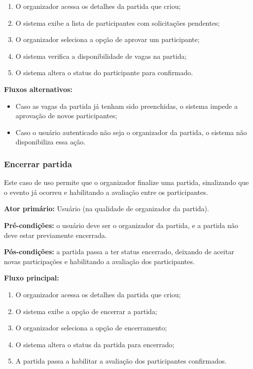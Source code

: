 \documentclass[a4paper, 12pt]{article}
\begin{document}
\begin{justify}
\begin{enumerate}
    \item O organizador acessa os detalhes da partida que criou;
    \item O sistema exibe a lista de participantes com solicitações pendentes;
    \item O organizador seleciona a opção de aprovar um participante;
    \item O sistema verifica a disponibilidade de vagas na partida;
    \item O sistema altera o status do participante para confirmado.
\end{enumerate}

\textbf{Fluxos alternativos:}

\begin{itemize}
    \item Caso as vagas da partida já tenham sido preenchidas, o sistema impede a aprovação de novos participantes;
    \item Caso o usuário autenticado não seja o organizador da partida, o sistema não disponibiliza essa ação.
\end{itemize}

\subsubsection{Encerrar partida}

Este caso de uso permite que o organizador finalize uma partida, sinalizando que o evento já ocorreu e habilitando a avaliação entre os participantes.

\textbf{Ator primário:} Usuário (na qualidade de organizador da partida).

\textbf{Pré-condições:} o usuário deve ser o organizador da partida, e a partida não deve estar previamente encerrada.

\textbf{Pós-condições:} a partida passa a ter status encerrado, deixando de aceitar novas participações e habilitando a avaliação dos participantes.

\textbf{Fluxo principal:}

\begin{enumerate}
    \item O organizador acessa os detalhes da partida que criou;
    \item O sistema exibe a opção de encerrar a partida;
    \item O organizador seleciona a opção de encerramento;
    \item O sistema altera o status da partida para encerrado;
    \item A partida passa a habilitar a avaliação dos participantes confirmados.
\end{enumerate}


\end{justify}
\end{document}
